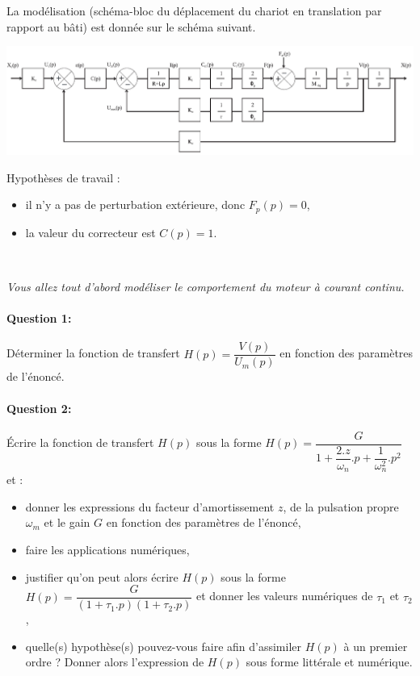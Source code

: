 La modélisation (schéma-bloc du déplacement du chariot en translation par rapport au bâti) est donnée sur le schéma suivant. 

\begin{center}
 \includegraphics[width=\linewidth]{img/img119}
\end{center}

\newpage 

Hypothèses de travail :
\begin{itemize}
 \item il n'y a pas de perturbation extérieure, donc $F_p(p)=0$,
 \item la valeur du correcteur est $C(p)=1$.
\end{itemize}

~\

\textit{Vous allez tout d'abord modéliser le comportement du moteur à courant continu.}

\paragraph{Question 1:} Déterminer la fonction de transfert $H(p)=\dfrac{V(p)}{U_m(p)}$ en fonction des paramètres de l'énoncé.

\paragraph{Question 2:} Écrire la fonction de transfert $H(p)$ sous la forme $H(p)=\dfrac{G}{1+\dfrac{2.z}{\omega_n}.p+\dfrac{1}{\omega_n^2}.p^2}$ et :
 \begin{itemize}
  \item donner les expressions du facteur d'amortissement $z$, de la pulsation propre $\omega_m$ et le gain $G$ en fonction des paramètres de l'énoncé,
  \item faire les applications numériques,
  \item justifier qu'on peut alors écrire $H(p)$ sous la forme $H(p)=\dfrac{G}{(1+\tau_1.p)(1+\tau_2.p)}$  et donner les valeurs numériques de $\tau_1$ et $\tau_2$,
  \item	quelle(s) hypothèse(s) pouvez-vous faire afin d'assimiler $H(p)$ à un premier ordre ? Donner alors l'expression de $H(p)$ sous forme littérale et numérique.
 \end{itemize}


